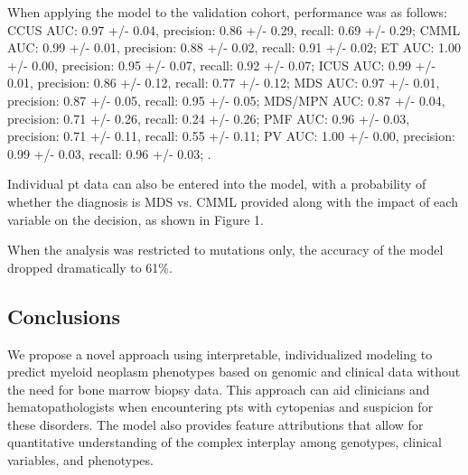 When applying the model to the validation cohort, performance was as follows: CCUS AUC: 0.97 +/- 0.04, precision: 0.86 +/- 0.29, recall: 0.69 +/- 0.29; CMML AUC: 0.99 +/- 0.01, precision: 0.88 +/- 0.02, recall: 0.91 +/- 0.02; ET AUC: 1.00 +/- 0.00, precision: 0.95 +/- 0.07, recall: 0.92 +/- 0.07; ICUS AUC: 0.99 +/- 0.01, precision: 0.86 +/- 0.12, recall: 0.77 +/- 0.12; MDS AUC: 0.97 +/- 0.01, precision: 0.87 +/- 0.05, recall: 0.95 +/- 0.05; MDS/MPN AUC: 0.87 +/- 0.04, precision: 0.71 +/- 0.26, recall: 0.24 +/- 0.26; PMF AUC: 0.96 +/- 0.03, precision: 0.71 +/- 0.11, recall: 0.55 +/- 0.11; PV AUC: 1.00 +/- 0.00, precision: 0.99 +/- 0.03, recall: 0.96 +/- 0.03; .

Individual pt data can also be entered into the model, with a probability of whether the diagnosis is MDS vs. CMML provided along with the impact of each variable on the decision, as shown in Figure 1.

When the analysis was restricted to mutations only, the accuracy of the model dropped dramatically to 61\%.


\subsection{Conclusions}%

We propose a novel approach using interpretable, individualized modeling to predict myeloid neoplasm phenotypes based on genomic and clinical data without the need for bone marrow biopsy data. This approach can aid clinicians and hematopathologists when encountering pts with cytopenias and suspicion for these disorders. The model also provides feature attributions that allow for quantitative understanding of the complex interplay among genotypes, clinical variables, and phenotypes.




